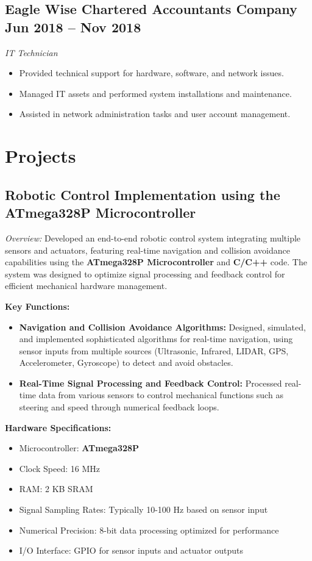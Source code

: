 \documentclass[a4paper,10pt]{article}
\begin{document}
\subsection*{Eagle Wise Chartered Accountants Company \hfill Jun 2018 – Nov 2018}
\textit{IT Technician}
\begin{itemize}
    \item Provided technical support for hardware, software, and network issues.
    \item Managed IT assets and performed system installations and maintenance.
    \item Assisted in network administration tasks and user account management.
\end{itemize}

\section{Projects}

\subsection*{Robotic Control Implementation using the ATmega328P Microcontroller}
\textit{Overview:} Developed an end-to-end robotic control system integrating multiple sensors and actuators, featuring real-time navigation and collision avoidance capabilities using the \textbf{ATmega328P Microcontroller} and \textbf{C/C++} code. The system was designed to optimize signal processing and feedback control for efficient mechanical hardware management.

\textbf{Key Functions:}
\begin{itemize}
    \item \textbf{Navigation and Collision Avoidance Algorithms:} Designed, simulated, and implemented sophisticated algorithms for real-time navigation, using sensor inputs from multiple sources (Ultrasonic, Infrared, LIDAR, GPS, Accelerometer, Gyroscope) to detect and avoid obstacles.
    \item \textbf{Real-Time Signal Processing and Feedback Control:} Processed real-time data from various sensors to control mechanical functions such as steering and speed through numerical feedback loops.
\end{itemize}

\textbf{Hardware Specifications:}
\begin{itemize}
    \item Microcontroller: \textbf{ATmega328P}
    \item Clock Speed: 16 MHz
    \item RAM: 2 KB SRAM
    \item Signal Sampling Rates: Typically 10-100 Hz based on sensor input
    \item Numerical Precision: 8-bit data processing optimized for performance
    \item I/O Interface: GPIO for sensor inputs and actuator outputs
\end{itemize}
\end{document}
